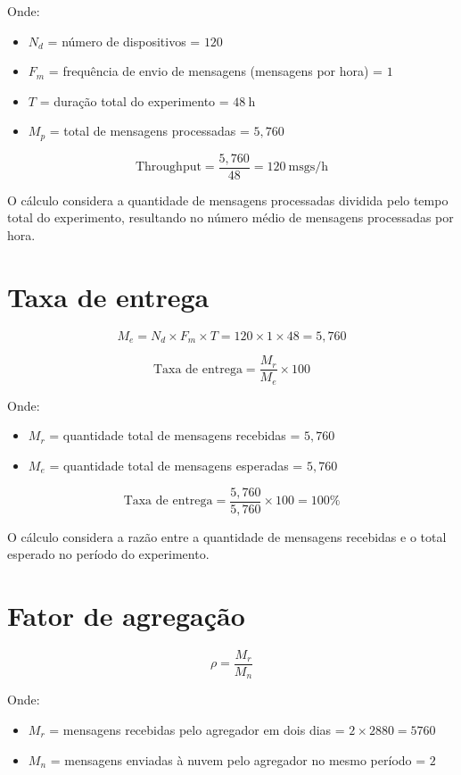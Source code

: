Onde:  
\begin{itemize}
    \item \(N_d\) = número de dispositivos = \(120\)
    \item \(F_m\) = frequência de envio de mensagens (mensagens por hora) = \(1\)
    \item \(T\) = duração total do experimento = \(48\ \text{h}\)
    \item \(M_p\) = total de mensagens processadas = \(5{,}760\)
\end{itemize}

\[
\text{Throughput} = \frac{5{,}760}{48} = 120\ \text{msgs/h}
\]

O cálculo considera a quantidade de mensagens processadas dividida pelo tempo total do experimento, resultando no número médio de mensagens processadas por hora.

\section{Taxa de entrega}

\[
M_e = N_d \times F_m \times T = 120 \times 1 \times 48 = 5{,}760
\]

\[
\text{Taxa de entrega} = \frac{M_r}{M_e} \times 100
\]

Onde:  
\begin{itemize}
    \item \(M_r\) = quantidade total de mensagens recebidas = \(5{,}760\)
    \item \(M_e\) = quantidade total de mensagens esperadas = \(5{,}760\)
\end{itemize}

\[
\text{Taxa de entrega} = \frac{5{,}760}{5{,}760} \times 100 = 100\%
\]

O cálculo considera a razão entre a quantidade de mensagens recebidas e o total esperado no período do experimento.

\section{Fator de agregação}

\[
\rho = \frac{M_r}{M_n}
\]

Onde:  
\begin{itemize}
    \item \(M_r\) = mensagens recebidas pelo agregador em dois dias = \(2 \times 2880 = 5760\)
    \item \(M_n\) = mensagens enviadas à nuvem pelo agregador no mesmo período = \(2\)
\end{itemize}

